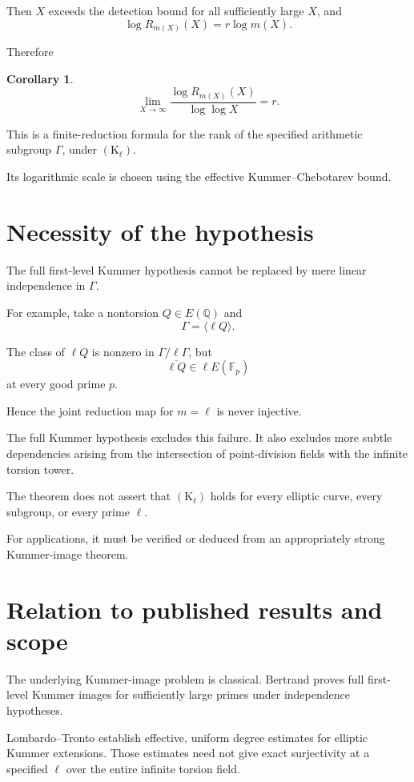 \documentclass[11pt]{article}
\newtheorem{corollary}[theorem]{Corollary}
\begin{document}
Then $X$ exceeds the detection bound
for all sufficiently large $X$, and
\[
\log R_{m(X)}(X)
=r\log m(X).
\]

Therefore
\begin{corollary}
\[
\boxed{
\lim_{X\to\infty}
\frac{\log R_{m(X)}(X)}
{\log\log X}=r.
}
\]
\end{corollary}

This is a finite-reduction formula for
the rank of the specified arithmetic
subgroup $\Gamma$, under
$(\mathrm K_\ell)$.

Its logarithmic scale is chosen using
the effective Kummer--Chebotarev bound.

\section{Necessity of the hypothesis}

The full first-level Kummer hypothesis
cannot be replaced by mere linear
independence in $\Gamma$.

For example, take a nontorsion
$Q\in E(\mathbb Q)$ and
\[
\Gamma=\langle\ell Q\rangle.
\]

The class of $\ell Q$ is nonzero in
$\Gamma/\ell\Gamma$, but
\[
\overline{\ell Q}\in
\ell E(\mathbb F_p)
\]
at every good prime $p$.

Hence the joint reduction map for
$m=\ell$ is never injective.

The full Kummer hypothesis excludes
this failure. It also excludes more
subtle dependencies arising from the
intersection of point-division fields
with the infinite torsion tower.

The theorem does not assert that
$(\mathrm K_\ell)$ holds for every
elliptic curve, every subgroup, or
every prime $\ell$.

For applications, it must be verified
or deduced from an appropriately
strong Kummer-image theorem.

\section{Relation to published results and scope}

The underlying Kummer-image problem
is classical. Bertrand
\cite{Bertrand} proves full
first-level Kummer images for
sufficiently large primes under
independence hypotheses.

Lombardo--Tronto
\cite{LT} establish effective,
uniform degree estimates for
elliptic Kummer extensions.
Those estimates need not give exact
surjectivity at a specified $\ell$
over the entire infinite torsion field.
\end{document}
